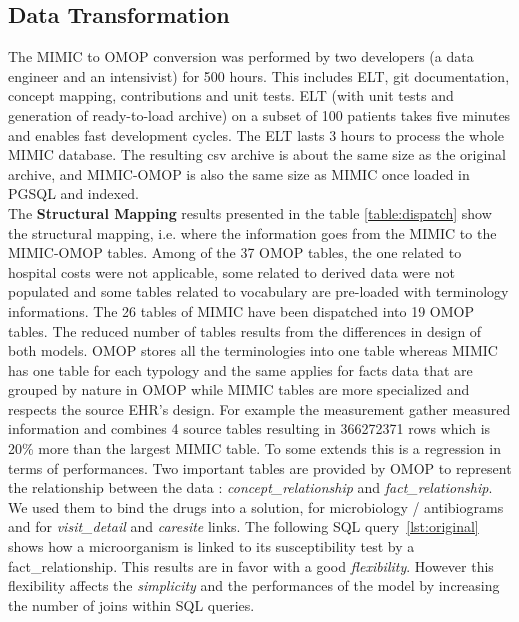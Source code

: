 %
% 
\subsection{Data Transformation}

%
%

The MIMIC to OMOP conversion was performed by two developers (a data engineer
and an intensivist) for 500 hours. This includes ELT, git documentation,
concept mapping, contributions and unit tests. ELT (with unit tests and
generation of ready-to-load archive) on a subset of 100 patients takes five
minutes and enables fast development cycles. The ELT lasts 3 hours to process
the whole MIMIC database. The resulting csv archive is about the same size as
the original archive, and MIMIC-OMOP is also the same size as MIMIC once loaded
in PGSQL and indexed.
\\

%
%
The \textbf{Structural Mapping} results presented in the table
\ref{table:dispatch} show the structural mapping, i.e. where the information
goes from the MIMIC to the MIMIC-OMOP tables. Among of the 37 OMOP tables, the
one related to hospital costs were not applicable, some related to derived data
were not populated and some tables related to vocabulary are pre-loaded with
terminology informations. The 26 tables of MIMIC have been dispatched into 19
OMOP tables. The reduced number of tables results from the differences in
design of both models. OMOP stores all the terminologies into one table whereas
MIMIC has one table for each typology and the same applies for facts data that
are grouped by nature in OMOP while MIMIC tables are more specialized and
respects the source EHR's design. For example the measurement gather measured
information and combines 4 source tables resulting in 366272371 rows which is
20\% more than the largest MIMIC table. To some extends this is a regression in
terms of performances.
Two important tables are provided by OMOP to represent the relationship between
the data : \textit{concept\_relationship} and \textit{fact\_relationship}. We
used them to bind the drugs into a solution, for microbiology / antibiograms
and for \textit{visit\_detail} and \textit{caresite} links. The following SQL
query~\ref{lst:original} shows how a microorganism is linked to its
susceptibility test by a fact\_relationship. This results are in favor with a
good \textit{flexibility}. However this flexibility affects the
\textit{simplicity} and the performances of the model by increasing the number
of joins within SQL queries. 


